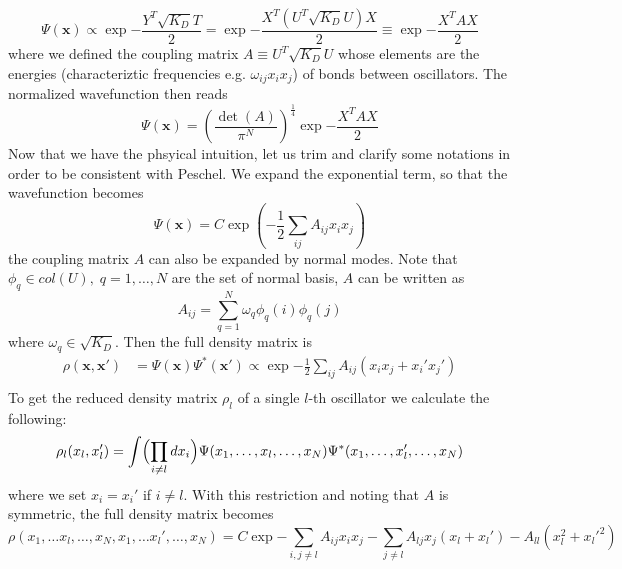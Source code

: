 \documentclass[letterpaper,prb,superscriptaddress]{revtex4}
\theoremstyle{definition}
\begin{document}
\begin{equation}
	\Psi(\mathbf{x}) \propto \exp{-\frac{Y^T \sqrt{K_D} T}{2}} = \exp{-\frac{X^T (U^T\sqrt{K_D}U)X}{2}} \equiv \exp{-\frac{X^T A X}{2}}
\end{equation}
where we defined the coupling matrix $A \equiv U^T \sqrt{K_D} U$ whose elements are the energies (characteriztic frequencies e.g. $\omega_{ij} x_ix_j$)  of bonds between oscillators. The normalized wavefunction then reads
\begin{equation}
	\Psi(\mathbf{x}) = \left( \frac{\det(A)}{\pi^N} \right)^{\frac{1}{4}}\exp{-\frac{X^T A X}{2}}
\end{equation}
Now that we have the phsyical intuition, let us trim and clarify some notations in order to be consistent with Peschel. We expand the exponential term, so that the wavefunction becomes
\begin{equation}
	\Psi(\mathbf{x}) = C \exp(-\frac{1}{2} \sum_{ij} A_{ij} x_i x_j )
\end{equation}
the coupling matrix $A$ can also be expanded by normal modes. Note that $\phi_q \in col(U), \; q = 1,\ldots,N$ are the set of normal basis, $A$ can be written as
\begin{equation}
	A_{ij} = \sum_{q=1}^N \omega_q \phi_q(i) \phi_q(j) 
\end{equation}
where $\omega_q \in \sqrt{K_D}$. Then the full density matrix is
\begin{equation}
\begin{split}
	\rho(\mathbf{x}, \mathbf{x}') &= \Psi(\mathbf{x})\Psi^*(\mathbf{x}') \propto \exp{-\frac{1}{2}\sum_{ij}  A_{ij} (x_i x_j + x_{i}' x_{j}') }\\
\end{split}
\end{equation}
To get the reduced density matrix $\rho_l$ of a single $l$-th oscillator we calculate the following:
\begin{equation}
	\rho_l(x_l, x_l') = \int \Bigl(\prod_{i\neq l} dx_i\Bigr)  \Psi(x_1,\ldots, x_l, \ldots, x_N) \Psi^*(x_1,\ldots, x_l', \ldots, x_N)
\end{equation}
where we set $x_i = x_i'$ if  $i \neq l$. With this restriction and noting that $A$ is symmetric, the full density matrix becomes
\begin{equation}
	\rho(x_1, \ldots x_l, \ldots, x_N,x_1, \ldots x_l', \ldots, x_N) = C\exp{-\sum_{i,j\neq l} A_{ij} x_i x_j - \sum_{j\neq l} A_{lj}x_j (x_l + x_l') - A_{ll} (x_l^2 + x_l'^2)  }
\end{equation}












%
\end{document}
